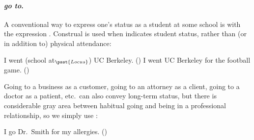 
\paragraph{\emph{go to}.} A conventional way to express one's status as a student at some school is 
with the expression .
Construal is used when  indicates student status, rather than 
(or in addition to) physical attendance:
\begin{exe}
  \ex\label{ex:student} I went  (school at$_{\psst{Locus}}$) UC Berkeley. ()
   I went  UC Berkeley for the football game. ()
\end{exe}
Going to a business as a customer, going to an attorney as a client, 
going to a doctor as a patient, etc.\ can also convey long-term status, 
but there is considerable gray area between habitual going and 
being in a professional relationship, so we simply use :
\begin{exe}
  \ex I go  Dr.~Smith for my allergies. ()
\end{exe}

